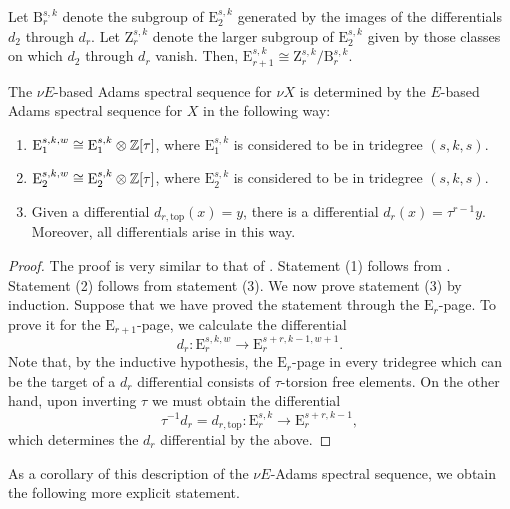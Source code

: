  \begin{ntn}
 Let $\mathrm{B}_r^{s,k}$ denote the subgroup of $\mathrm{E}_2^{s,k}$ generated by the images of the differentials $d_2$ through $d_r$. Let $\mathrm{Z}_r^{s,k}$ denote the larger subgroup of $\mathrm{E}_2^{s,k}$ given by those classes on which $d_2$ through $d_r$ vanish. Then, $\mathrm{E}_{r+1}^{s,k} \cong \mathrm{Z}_r^{s,k}/\mathrm{B}_r^{s,k}$.
 \end{ntn}

\begin{thm} \label{thm:synth-ASS}
    The $\nu E$-based Adams spectral sequence for $\nu X$ is determined by the $E$-based Adams spectral sequence for $X$ in the following way:
    \begin{enumerate}
    \item $ \mathrm{E}^{s,k,w}_1 \cong \mathrm{E}^{s,k}_1 \otimes \mathbb{Z}[\tau]$,
      where $\mathrm{E}^{s,k}_1$ is considered to be in tridegree $(s,k,s)$.
    \item $ \mathrm{E}^{s,k,w}_2 \cong \mathrm{E}^{s,k}_2 \otimes \mathbb{Z}[\tau]$,
      where $\mathrm{E}^{s,k}_2$ is considered to be in tridegree $(s,k,s)$.
    \item Given a differential $d_{r, \mathrm{top}} (x) = y$, there is a differential $d_r (x) = \tau^{r-1} y$. Moreover, all differentials arise in this way.
    \end{enumerate}
\end{thm}

\begin{proof}
  The proof is very similar to that of \cite[Lemma 15]{HKO}.
  Statement (1) follows from \cite[Proposition 4.21]{Pstragowski}.
  Statement (2) follows from statement (3).
  We now prove statement (3) by induction. Suppose that we have proved the statement through the $\mathrm{E}_r$-page.  To prove it for the $\mathrm{E}_{r+1}$-page, we calculate the differential
  $$ d_r : \mathrm{E}^{s,k,w}_r \to \mathrm{E}_r^{s+r,k-1,w+1}. $$
  Note that, by the inductive hypothesis, the $\mathrm{E}_r$-page in every tridegree which can be the target of a $d_r$ differential consists of $\tau$-torsion free elements.  On the other hand, upon inverting $\tau$ we must obtain the differential
$$\tau^{-1} d_r = d_{r,\mathrm{top}}: \mathrm{E}^{s,k}_{r} \to \mathrm{E}^{s+r,k-1}_{r},$$
which determines the $d_r$ differential by the above.
\end{proof}

As a corollary of this description of the $\nu E$-Adams spectral sequence, we obtain the following more explicit statement.

